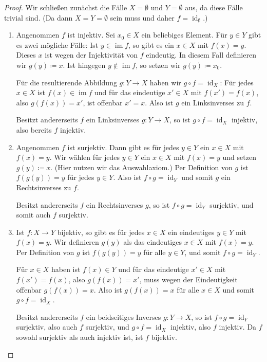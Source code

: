 \documentclass[a4paper,10pt]{article}
\theoremstyle{definition}
\DeclareMathOperator{\im}{im}
\DeclareMathOperator{\id}{id}
\begin{document}
\begin{proof}
 Wir schließen zunächst die Fälle $X = \emptyset$ und $Y = \emptyset$ aus, da diese Fälle trivial sind. (Da dann $X = Y = \emptyset$ sein muss und daher $f = \id_\emptyset$.)
 \begin{enumerate}[label=\arabic*),leftmargin=*]
  \item
   Angenommen $f$ ist injektiv. Sei $x_0 \in X$ ein beliebiges Element. Für $y \in Y$ gibt es zwei mögliche Fälle: Ist $y \in \im f$, so gibt es ein $x \in X$ mit $f(x) = y$. Dieses $x$ ist wegen der Injektivität von $f$ eindeutig. In diesem Fall definieren wir $g(y) \coloneqq x$. Ist hingegen $y \notin \im f$, so setzen wir $g(y) \coloneqq x_0$.
   
   Für die resultierende Abbildung $g \colon Y \to X$ haben wir $g \circ f = \id_X$: Für jedes $x \in X$ ist $f(x) \in \im f$ und für das eindeutige $x' \in X$ mit $f(x') = f(x)$, also $g(f(x)) = x'$, ist offenbar $x' = x$. Also ist $g$ ein Linksinverses zu $f$.
   
   Besitzt andererseits $f$ ein Linksinverses $g \colon Y \to X$, so ist $g \circ f = \id_X$ injektiv, also bereits $f$ injektiv.
   
  \item
   Angenommen $f$ ist surjektiv. Dann gibt es für jedes $y \in Y$ ein $x \in X$ mit $f(x) = y$. Wir wählen für jedes $y \in Y$ ein $x \in X$ mit $f(x) = y$ und setzen $g(y) \coloneqq x$. (Hier nutzen wir das Auswahlaxiom.) Per Definition von $g$ ist $f(g(y)) = y$ für jedes $y \in Y$. Also ist $f \circ g = \id_Y$ und somit $g$ ein Rechtsinverses zu $f$.
   
   Besitzt andererseits $f$ ein Rechtsinverses $g$, so ist $f \circ g = \id_Y$ surjektiv, und somit auch $f$ surjektiv.
   
  \item
   Ist $f \colon X \to Y$ bijektiv, so gibt es für jedes $x \in X$ ein eindeutiges $y \in Y$ mit $f(x) = y$. Wir definieren $g(y)$ als das eindeutiges $x \in X$ mit $f(x) = y$. Per Definition von $g$ ist $f(g(y)) = y$ für alle $y \in Y$, und somit $f \circ g = \id_Y$.
   
   Für $x \in X$ haben ist $f(x) \in Y$ und für das eindeutige $x' \in X$ mit $f(x') = f(x)$, also $g(f(x)) = x'$, muss wegen der Eindeutigkeit offenbar $g(f(x)) = x$. Also ist $g(f(x)) = x$ für alle $x \in X$ und somit $g \circ f = \id_X$.
   
   Besitzt andererseits $f$ ein beidseitiges Inverses $g \colon Y \to X$, so ist $f \circ g = \id_Y$ surjektiv, also auch $f$ surjektiv, und $g \circ f = \id_X$ injektiv, also $f$ injektiv. Da $f$ sowohl surjektiv als auch injektiv ist, ist $f$ bijektiv.
  \qedhere
 \end{enumerate}
\end{proof}
\end{document}

